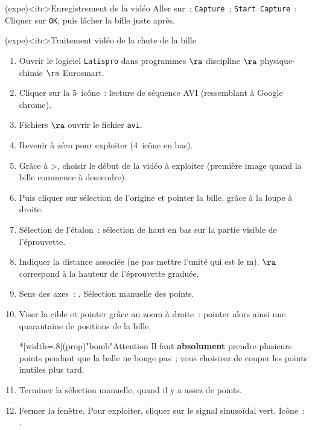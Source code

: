 \documentclass[../main/main.tex]{subfiles}
\begin{document}
{	\begin{tcb}(expe)<itc>{Enregistrement de la vidéo}
		Aller sur~: \texttt{Capture}~; \texttt{Start Capture}~: Cliquer sur \texttt{OK},
		puis lâcher la bille juste après.
	\end{tcb}

	\begin{tcb}[breakable](expe)<itc>{Traitement vidéo de la chute de la bille}
		\begin{enumerate}
			\item Ouvrir le logiciel \texttt{Latispro} dans programmes $\ra$
			      discipline $\ra$ physique-chimie $\ra$ Eurosmart.
			\item Cliquer sur la 5\ieme\ icône~: lecture de séquence AVI (ressemblant à
			      Google chrome).
			\item Fichiers $\ra$ ouvrir le fichier \texttt{avi}.
			\item Revenir à zéro pour exploiter (4\ieme\ icône en bas).
			\item Grâce à >, choisir le début de la vidéo à exploiter (première image
			      quand la bille commence à descendre).
			\item Puis cliquer sur sélection de l'origine et pointer la bille, grâce à
			      la loupe à droite.
			\item Sélection de l'étalon~: sélection de haut en bas sur la partie visible
			      de l'éprouvette.
			\item Indiquer la distance associée (ne pas mettre l'unité qui est le
			      \si{m}). $\ra$ correspond à la hauteur de l'éprouvette graduée.
			\item Sens des axes~: \fbox{$\downarrow \ra$}. Sélection manuelle des
			      points.
			\item Viser la cible et pointer grâce au zoom à droite~: pointer alors ainsi
			      une quarantaine de positions de la bille.
			      \begin{center}
				      \begin{tcb}*[width=.8\linewidth](prop)"bomb"{Attention}
					      Il faut \textbf{absolument} prendre plusieurs points pendant que
					      la balle ne bouge pas~; vous choisirez de couper les points
					      inutiles plus tard.
				      \end{tcb}
			      \end{center}
			\item Terminer la sélection manuelle, quand il y a assez de points.
			\item Fermer la fenêtre. Pour exploiter, cliquer sur le signal sinusoïdal
			      vert. Icône~: \fbox{$\sim$}.
		\end{enumerate}
	\end{tcb}

}
\end{document}
